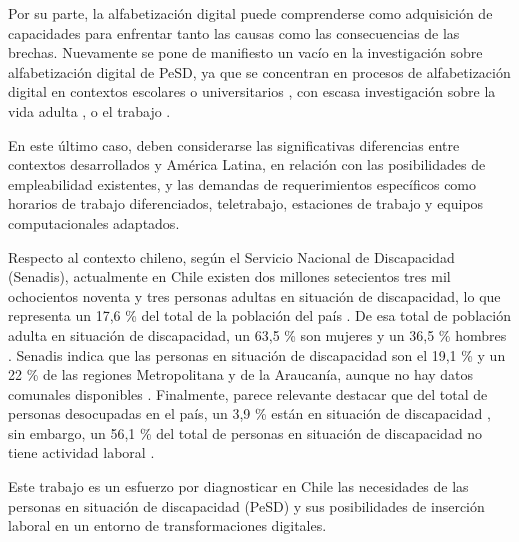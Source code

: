 Por su parte, la alfabetización digital puede comprenderse como
adquisición de capacidades para enfrentar tanto las causas como las
consecuencias de las brechas. Nuevamente se pone de manifiesto un vacío
en la investigación sobre alfabetización digital de PeSD, ya que se
concentran en procesos de alfabetización digital en contextos escolares
o universitarios \cite{IBRAIMKULOV2022}, con escasa
investigación sobre la vida adulta \cite{BARLOTT2021}, o el
trabajo \cite{GUPTA2021}.

En este último caso, deben considerarse las significativas diferencias
entre contextos desarrollados y América Latina, en relación con las
posibilidades de empleabilidad existentes, y las demandas de
requerimientos específicos como horarios de trabajo diferenciados,
teletrabajo, estaciones de trabajo y equipos computacionales adaptados.

Respecto al contexto chileno, según el Servicio Nacional de Discapacidad
(Senadis), actualmente en Chile existen dos millones setecientos tres
mil ochocientos noventa y tres personas adultas en situación de
discapacidad, lo que representa un 17,6 \% del total de la población del
país \cite[p. 14]{SENADIS2022}. De esa total de población adulta en
situación de discapacidad, un 63,5 \% son mujeres y un 36,5 \% hombres
\cite[p. 18]{SENADIS2022}. Senadis indica que las personas en situación de discapacidad son el 19,1 \% y un 22 \% de las regiones Metropolitana y de la Araucanía, aunque no hay datos comunales disponibles \cite[p. 30]{SENADIS2022}. Finalmente, parece relevante destacar que del total de personas desocupadas en el país, un 3,9 \% están en situación de discapacidad \cite[p. 52]{SENADIS2022}, sin embargo, un 56,1 \% del total de personas en situación de discapacidad no tiene actividad laboral \cite[p. 58]{SENADIS2022}.

Este trabajo es un esfuerzo por diagnosticar en Chile las necesidades de
las personas en situación de discapacidad (PeSD) y sus posibilidades de
inserción laboral en un entorno de transformaciones digitales.

